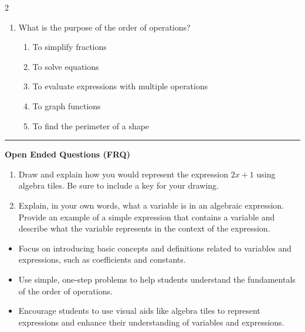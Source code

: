 \documentclass[10pt]{article}
\begin{document}
\begin{multicols}{2}
\begin{enumerate}[label=\textbf{Q\arabic*.}, leftmargin=*, itemsep=6pt, parsep=0pt]
  \item \small What is the purpose of the order of operations?
  \begin{enumerate}[label=(\Alph*), leftmargin=0.6cm, nosep, itemsep=2pt]
    \item To simplify fractions
    \item To solve equations
    \item To evaluate expressions with multiple operations
    \item To graph functions
    \item To find the perimeter of a shape
  \end{enumerate}

\end{enumerate}
\end{multicols}

\vspace{-0.2cm}
\hrule
\vspace{0.2cm}
\textbf{\small Open Ended Questions (FRQ)}
\begin{enumerate}[label=\textbf{Q\arabic*.}, start=9, itemsep=5pt, topsep=0pt]

  \item \small Draw and explain how you would represent the expression $2x + 1$ using algebra tiles. Be sure to include a key for your drawing. \vspace{2cm}

  \item \small Explain, in your own words, what a variable is in an algebraic expression. Provide an example of a simple expression that contains a variable and describe what the variable represents in the context of the expression. \vspace{2cm}

\end{enumerate}

\vfill

\begin{tcolorbox}[colback=blue!5, colframe=mainblue!50, title=\small \textbf{Chef's Tips}, fonttitle=\bfseries, bottom=1mm]
\begin{itemize}[noitemsep, topsep=2pt, leftmargin=0.5cm]
  \item \scriptsize Focus on introducing basic concepts and definitions related to variables and expressions, such as coefficients and constants.\item \scriptsize Use simple, one-step problems to help students understand the fundamentals of the order of operations.\item \scriptsize Encourage students to use visual aids like algebra tiles to represent expressions and enhance their understanding of variables and expressions.
\end{itemize}
\end{tcolorbox}
\end{document}

